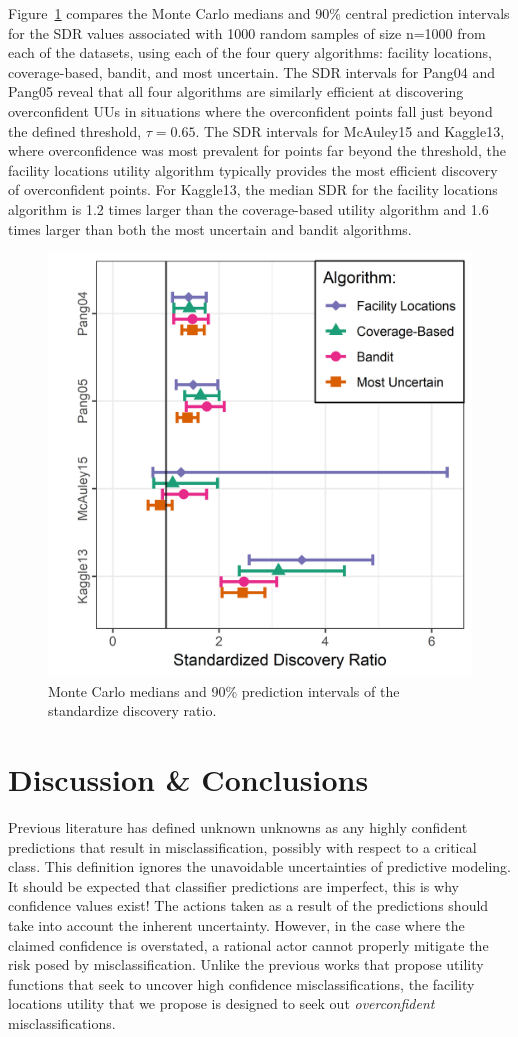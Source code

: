 \documentclass[letterpaper]{article} %
\begin{document}
Figure~\ref{fig:sdr} compares the Monte Carlo medians and 90\%  central prediction intervals for the SDR values associated with 1000 random samples of size n=1000 from each of the datasets, using each of the four query algorithms: facility locations, coverage-based, bandit, and most uncertain. The SDR intervals for Pang04 and Pang05 reveal that all four algorithms are similarly efficient at discovering overconfident UUs in situations where the overconfident points fall just beyond the defined threshold, $\tau = 0.65$. The SDR intervals for McAuley15 and Kaggle13, where overconfidence was most prevalent for points far beyond the threshold, the facility locations utility algorithm typically provides the most efficient discovery of overconfident points. For Kaggle13, the median SDR for the facility locations algorithm is 1.2 times larger than the coverage-based utility algorithm and 1.6 times larger than both the most uncertain and bandit algorithms.

\begin{figure}[hbtp]
  \includegraphics[width=.49\textwidth]{../experimentsAndPlots/discoveryRatioPlaceholder.png}
  \caption{Monte Carlo medians and 90\% prediction intervals of the standardize discovery ratio.}
  \label{fig:sdr}
\end{figure}

\section{Discussion \& Conclusions}

Previous literature has defined unknown unknowns as any highly confident predictions that result in misclassification, possibly with respect to a critical class. This definition ignores the unavoidable uncertainties of predictive modeling. It should be expected that classifier predictions are imperfect, this is why confidence values exist! The actions taken as a result of the predictions should take into account the inherent uncertainty. However, in the case where the claimed confidence is overstated, a rational actor cannot properly mitigate the risk posed by misclassification. Unlike the previous works that propose utility functions that seek to uncover high confidence misclassifications, the facility locations utility that we propose is designed to seek out \textit{overconfident} misclassifications. 
\end{document}
